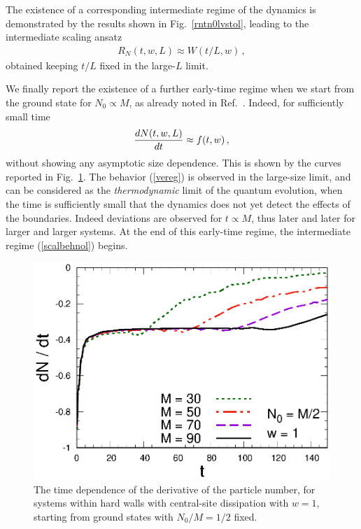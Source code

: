   
  The existence of a corresponding intermediate regime of the dynamics
  is demonstrated by the results shown in Fig.~\ref{rntn0lvstol},
  leading to the intermediate scaling ansatz
  \begin{eqnarray}
   R_N(t,w,L) \approx W(t/L,w)\,,   \label{scalbehnol}
  \end{eqnarray}
  obtained keeping $t/L$ fixed in the large-$L$ limit.  
  
  We finally report the existence of a further early-time regime when we
  start from the ground state for $N_0\propto M$, as already noted in
  Ref.~\cite{FMKCD-20}. Indeed, for sufficiently small time
  \begin{equation}
    {d N(t,w,L)\over dt} \approx  f(t,w)\,,
    \label{vereg}
    \end{equation}
  without showing any asymptotic size dependence.  This is shown by the
  curves reported in Fig.~\ref{rntln0lvst}.  The behavior (\ref{vereg})
  is observed in the large-size limit, and can be considered as the {\em
    thermodynamic} limit of the quantum evolution, when the time is
  sufficiently small that the dynamics does not yet detect the effects
  of the boundaries.  Indeed deviations are observed for $t\propto M$,
  thus later and later for larger and larger systems. At the end of this
  early-time regime, the intermediate regime (\ref{scalbehnol}) begins.
  
  
  
  \begin{figure}[!htb]
\centering
  \includegraphics[width=0.65\columnwidth]{imm/dNLL0.eps}
  \caption{The time dependence of the derivative of the particle number,
    for systems within hard walls with central-site dissipation with
    $w=1$, starting from ground states with $N_0/M=1/2$ fixed.  }
    \label{rntln0lvst}
  \end{figure}
  
